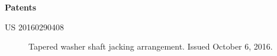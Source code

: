 \documentclass[letterpaper,10pt]{extarticle}
\newcommand{\resheading}[1]{{\large \colorbox{mygrey}{\begin{minipage}{\textwidth}{\textbf{#1 \vphantom{p\^{E}}}}\end{minipage}}}}
\begin{document}
   
\begin{comment}
\resheading{Miscellaneous}
\begin{description}
\vspace{-0.2in}

\item[] \hfill 
\begin{multicols}{3}
Rock Climbing (Trad/Sport) \\ Backpacking \\ Skiing/Snowboarding \\ Backcountry Snowsports \\ Eagle Scout  \\ Kayaking \\ Computer Programming \\ Trail Running
\end{multicols}
\end{description}
\end{comment}

\resheading{Patents}
\vspace{-0.4cm}
\begin{description}

\item[US 20160290408] Tapered washer shaft jacking arrangement. Issued October 6, 2016. 
\end{description}
\end{document}
